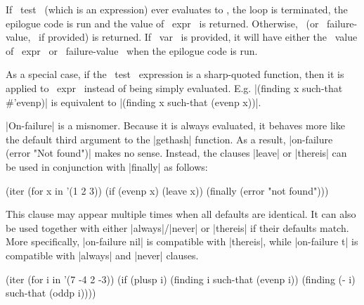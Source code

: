 \begin{clauses}

If ~test~ (which is an expression) ever evaluates to \nonnil, the loop
is terminated, the
epilogue code is run and the value of ~expr~ is returned.  Otherwise,
\nil\ (or ~failure-value,~ if provided) is returned.  If ~var~ is
provided, it will have either the \nonnil\ value of ~expr~ or
~failure-value~ when the epilogue code is run.

\cpar As a special case, if the ~test~ expression is a sharp-quoted
function, then it is applied to ~expr~ instead of being simply
evaluated.  E.g. |(finding x such-that \#'evenp)| is equivalent to
|(finding x such-that (evenp x))|.


\cpar |On-failure| is a misnomer. Because it is always evaluated, it behaves
more like the default third argument to the |gethash| function. As a result,
|on-failure (error "Not found")| makes no sense. Instead, the clauses |leave|
or |thereis| can be used in conjunction with |finally| as follows:
\begin{program}
(iter (for x in '(1 2 3))
      (if (evenp x) (leave x))
      (finally (error "not found")))
\end{program}

\cpar This clause may appear multiple times when all defaults are
identical. It can also be used together with either |always|/|never| or
|thereis| if their defaults match. More specifically, |on-failure nil| is
compatible with |thereis|, while |on-failure t| is compatible with |always|
and |never| clauses.
\begin{program}
(iter (for i in '(7 -4 2 -3))
      (if (plusp i)
	  (finding    i  such-that (evenp i))
          (finding (- i) such-that (oddp i))))
\end{program}


\end{clauses}
